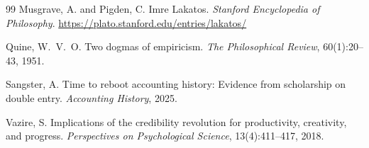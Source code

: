 \documentclass[11pt,letterpaper]{article}
\begin{document}
\begin{thebibliography}{99}
Musgrave, A. and Pigden, C.
\newblock Imre Lakatos.
\newblock \emph{Stanford Encyclopedia of Philosophy}.
\newblock \url{https://plato.stanford.edu/entries/lakatos/}

Quine, W.~V.~O.
\newblock Two dogmas of empiricism.
\newblock \emph{The Philosophical Review}, 60(1):20--43, 1951.

Sangster, A.
\newblock Time to reboot accounting history: Evidence from scholarship on
double entry.
\newblock \emph{Accounting History}, 2025.

Vazire, S.
\newblock Implications of the credibility revolution for productivity,
creativity, and progress.
\newblock \emph{Perspectives on Psychological Science}, 13(4):411--417, 2018.

\end{thebibliography}
\end{document}
